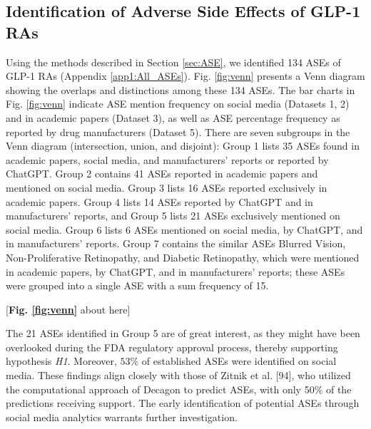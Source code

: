 \documentclass[referee,bst/sn-basic]{sn-jnl}%
\begin{document}
\subsection{Identification of Adverse Side Effects of GLP-1 RAs} 
\label{subsec:res_ASE}
Using the methods described in Section \ref{sec:ASE}, we identified 134 ASEs of GLP-1 RAs (Appendix \ref{app1:All_ASEs}).
Fig. \ref{fig:venn} presents a Venn diagram showing the overlaps and distinctions among these 134 ASEs.
The bar charts in Fig. \ref{fig:venn} indicate ASE mention frequency on social media (Datasets 1, 2) and in academic papers (Dataset 3), as well as ASE percentage frequency as reported by drug manufacturers (Dataset 5).
There are seven subgroups in the Venn diagram (intersection, union, and disjoint):
Group 1 lists 35 ASEs found in academic papers, social media, and manufacturers' reports or reported by ChatGPT.
Group 2 contains 41 ASEs reported in academic papers and mentioned on social media.
Group 3 lists 16 ASEs reported exclusively in academic papers.
Group 4 lists 14 ASEs reported by ChatGPT and in manufacturers' reports, and 
Group 5 lists 21 ASEs exclusively mentioned on social media.
Group 6 lists 6 ASEs mentioned on social media, by ChatGPT, and in manufacturers' reports. 
Group 7 contains the similar ASEs Blurred Vision, Non-Proliferative Retinopathy, and Diabetic Retinopathy, which were mentioned in academic papers, by ChatGPT, and in manufacturers’ reports; these ASEs were grouped into a single ASE with a sum frequency of 15.

\begin{center}
    [\textbf{Fig. \ref{fig:venn}} about here]
\end{center}

The 21 ASEs identified in Group 5 are of great interest, as they might have been overlooked during the FDA regulatory approval process, thereby supporting hypothesis \textit{H1}.
Moreover, $53\%$ of established ASEs were identified on social media.
These findings align closely with those of Zitnik et al. [94], 
who utilized the computational approach of Decagon to predict ASEs, with only 50\% of the predictions receiving support.
The early identification of potential ASEs through social media analytics warrants further investigation.
\end{document}
